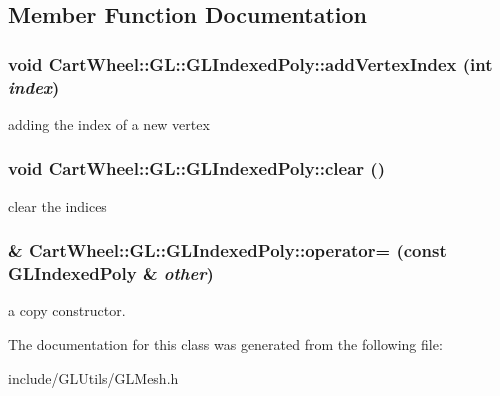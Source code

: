 \subsection{Member Function Documentation}
\hypertarget{classCartWheel_1_1GL_1_1GLIndexedPoly_a4f38506cb27baebf57df07766bf32e53}{
\subsubsection[{addVertexIndex}]{\setlength{\rightskip}{0pt plus 5cm}void CartWheel::GL::GLIndexedPoly::addVertexIndex (int {\em index})}}
\label{classCartWheel_1_1GL_1_1GLIndexedPoly_a4f38506cb27baebf57df07766bf32e53}
adding the index of a new vertex \hypertarget{classCartWheel_1_1GL_1_1GLIndexedPoly_ac4a271b76b0b2c4776dd3d183af85190}{
\subsubsection[{clear}]{\setlength{\rightskip}{0pt plus 5cm}void CartWheel::GL::GLIndexedPoly::clear ()}}
\label{classCartWheel_1_1GL_1_1GLIndexedPoly_ac4a271b76b0b2c4776dd3d183af85190}
clear the indices \hypertarget{classCartWheel_1_1GL_1_1GLIndexedPoly_a7a698956ee71f181476218a08b121d65}{
\subsubsection[{operator=}]{\& CartWheel::GL::GLIndexedPoly::operator= (const {\bf GLIndexedPoly} \& {\em other})}}
\label{classCartWheel_1_1GL_1_1GLIndexedPoly_a7a698956ee71f181476218a08b121d65}
a copy constructor. 

The documentation for this class was generated from the following file:\begin{DoxyCompactItemize}
\item 
include/GLUtils/GLMesh.h\end{DoxyCompactItemize}
